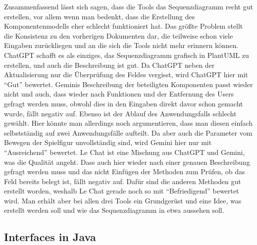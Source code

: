 Zusammenfassend lässt sich sagen, dass die Tools das Sequenzdiagramm recht gut erstellen, vor allem wenn man bedenkt, dass die 
Erstellung des Komponentenmodells eher schlecht funktioniert hat. Das größte Problem stellt die Konsistenz zu den vorherigen 
Dokumenten dar, die teilweise schon viele Eingaben zurückliegen und an die sich die Tools nicht mehr erinnern können. ChatGPT schafft 
es als einziges, das Sequenzdiagramm grafisch in PlantUML zu erstellen, und auch die Beschreibung ist gut. Da ChatGPT neben der 
Aktualisierung nur die Überprüfung des Feldes vergisst, wird ChatGPT hier mit ``Gut'' bewertet. Geminis Beschreibung der beteiligten 
Komponenten passt wieder nicht und auch, dass wieder nach Funktionen und der Entfernung des Users gefragt werden muss, obwohl dies in 
den Eingaben direkt davor schon gemacht wurde, fällt negativ auf. Ebenso ist der Ablauf des Anwendungsfalls schlecht gewählt. Hier 
könnte man allerdings noch argumentieren, dass man diesen einfach selbstständig auf zwei Anwendungsfälle aufteilt. Da aber auch die 
Parameter vom Bewegen der Spielfigur unvollständig sind, wird Gemini hier nur mit ``Ausreichend'' bewertet. Le Chat ist eine Mischung 
aus ChatGPT und Gemini, was die Qualität angeht. Dass auch hier wieder nach einer genauen Beschreibung gefragt werden muss und das 
nicht Einfügen der Methoden zum Prüfen, ob das Feld bereits belegt ist, fällt negativ auf. Dafür sind die anderen Methoden gut 
erstellt worden, weshalb Le Chat gerade noch so mit ``Befriedigend'' bewertet wird. Man erhält aber bei allen drei Tools ein Grundgerüst 
und eine Idee, was erstellt werden soll und wie das Sequenzdiagramm in etwa aussehen soll.

\subsection*{Interfaces in Java}

